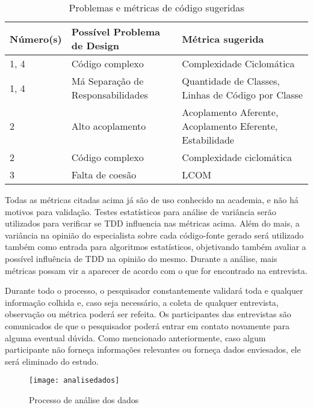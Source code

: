 \begin{table}[h!]
	\begin{tabular}{ | p{2cm} | p{7cm} | p{6cm} | }
		Número(s) & Possível Problema de Design & Métrica sugerida \\ \hline
		1, 4 & Código complexo & Complexidade Ciclomática \\
		1, 4 & Má Separação de Responsabilidades & Quantidade de Classes, Linhas de Código por Classe \\
		
		\hline
		
		2 & Alto acoplamento & Acoplamento Aferente, Acoplamento Eferente, Estabilidade \\
		2 & Código complexo & Complexidade ciclomática \\
		
		\hline
		
		3 & Falta de coesão & LCOM \\
		
		\hline
		
	\end{tabular}
	\caption{Problemas e métricas de código sugeridas}
\end{table}

Todas as métricas citadas acima já são de uso conhecido na academia, e não há 
motivos para validação. Testes estatísticos para análise de variância serão utilizados
para verificar se TDD influencia nas métricas acima.
Além do mais, a variância na opinião do especialista sobre cada código-fonte gerado
será utilizado também como entrada para algoritmos estatísticos, objetivando também
avaliar a possível influência de TDD na opinião do mesmo. Durante a análise, mais
métricas possam vir a aparecer de acordo com o que for encontrado na entrevista.

Durante todo o processo, o pesquisador constantemente validará toda e qualquer
informação colhida e, caso seja necessário, a coleta de qualquer entrevista,
observação ou métrica poderá ser refeita. Os participantes das entrevistas
são comunicados de que o pesquisador poderá entrar em contato
novamente para alguma eventual dúvida.
Como mencionado anteriormente, caso algum participante não forneça informações
relevantes ou forneça dados enviesados, ele será eliminado do estudo.

\begin{figure}
  \centering
  \texttt{[image: analisedados]}
  \caption{Processo de análise dos dados}
  \label{fig:analise-dados}
\end{figure}

